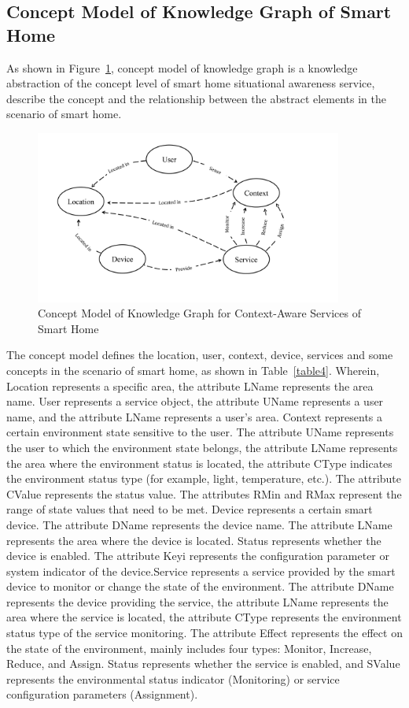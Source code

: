 \subsection{Concept Model of Knowledge Graph of Smart Home}
As shown in Figure~\ref{fig:conceptmodel}, concept model of knowledge graph is a knowledge abstraction of the concept level of smart home situational awareness service, describe the concept and the relationship between the abstract elements in the scenario of smart home.
\begin{figure}
	\centering
	\includegraphics[width=0.9\textwidth]{conceptmodel.png}
	\caption{Concept Model of Knowledge Graph for Context-Aware Services of Smart Home}
	\label{fig:conceptmodel}
\end{figure}
The concept model defines the location, user, context, device, services and some concepts in the scenario of smart home, as shown in Table~\ref{table4}. Wherein, Location represents a specific area, the attribute LName represents the area name. User represents a service object, the attribute UName represents a user name, and the attribute LName represents a user's area. Context represents a certain environment state sensitive to the user. The attribute UName represents the user to which the environment state belongs, the attribute LName represents the area where the environment status is located, the attribute CType indicates the environment status type (for example, light, temperature, etc.). The attribute CValue represents the status value. The attributes RMin and RMax represent the range of state values that need to be met. Device represents a certain smart device. The attribute DName represents the device name. The attribute LName represents the area where the device is located. Status represents whether the device is enabled. The attribute Keyi represents the configuration parameter or system indicator of the device.Service represents a service provided by the smart device to monitor or change the state of the environment. The attribute DName represents the device providing the service, the attribute LName represents the area where the service is located, the attribute CType represents the environment status type of the service monitoring. The attribute Effect represents the effect on the state of the environment, mainly includes four types: Monitor, Increase, Reduce, and Assign. Status represents whether the service is enabled, and SValue represents the environmental status indicator (Monitoring) or service configuration parameters (Assignment).

